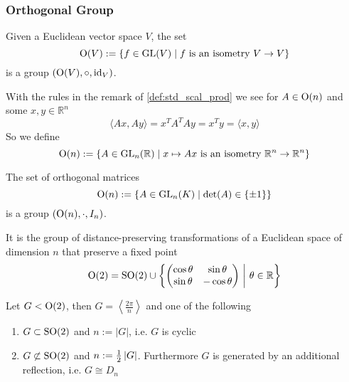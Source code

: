 \subsubsection{Orthogonal Group}
\begin{proposition}
   Given a Euclidean vector space \(V\), the set
   \[\operatorname{O}(V) := \{f \in \operatorname{GL}(V) \mid f~\text{is an isometry}~V \to V\}\]
   is a group \((\operatorname{O}(V), \circ, \operatorname{id}_V)\).
\end{proposition}
With the rules in the remark of \cref{def:std_scal_prod} we see for \(A \in \operatorname{O}(n)\) and some \(x, y \in \mathbb{R}^n\)
\[\langle Ax, Ay\rangle = x^TA^TAy = x^Ty = \langle x, y\rangle\]
So we define
\[\operatorname{O}(n) := \{A \in \operatorname{GL}_n(\mathbb{R}) \mid x \mapsto Ax~\text{is an isometry}~\mathbb{R}^n \to \mathbb{R}^n\}\]
\begin{proposition}
   The set of orthogonal matrices
   \[\operatorname{O}(n) := \{A \in \operatorname{GL}_n(K) \mid \det(A) \in \{\pm 1\}\}\]
   is a group \((\operatorname{O}(n), \cdot, I_n)\).
\end{proposition}
\begin{remark}
   It is the group of distance-preserving transformations of a Euclidean space of dimension \(n\) that preserve a fixed point
   \[\operatorname{O}(2) = \operatorname{SO}(2) \cup \left\{\begin{pmatrix}\cos\theta & \sin\theta\\ \sin\theta & -\cos\theta\end{pmatrix} ~\middle|~ \theta \in \mathbb{R}\right\}\]
\end{remark}

\begin{proposition}
   Let \(G < \operatorname{O}(2)\), then \(G = \left\langle \frac{2\pi}{n}\right\rangle\) and one of the following
   \begin{enumerate}[label=\roman*, align=Center]
      \item \(G \subset \operatorname{SO}(2)\) and \(n := |G|\), i.e. \(G\) is cyclic
      \item \(G \not\subset \operatorname{SO}(2)\) and \(n := \frac{1}{2} \left\lvert G\right\rvert\).
         Furthermore \(G\) is generated by an additional reflection, i.e. \(G \cong D_n\)
   \end{enumerate}
\end{proposition}

